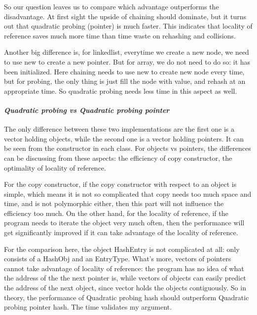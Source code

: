 \documentclass[]{article}
\let\oldparagraph\paragraph
\renewcommand{\paragraph}[1]{\oldparagraph{#1}\mbox{}}
\begin{document}
So our question leaves us to compare which advantage outperforms the
disadvantage. At first sight the upside of chaining should dominate, but
it turns out that quadratic probing (pointer) is much faster. This
indicates that locality of reference saves much more time than time
waste on rehashing and collisions.

Another big difference is, for linkedlist, everytime we create a new
node, we need to use new to create a new pointer. But for array, we do
not need to do so: it has been initialized. Here chaining needs to use
new to create new node every time, but for probing, the only thing is
just fill the node with value, and rehash at an appropriate time. So
quadratic probing needs less time in this aspect as well.

\paragraph{\texorpdfstring{\emph{Quadratic probing vs Quadratic probing
pointer}}{Quadratic probing vs Quadratic probing pointer}}\label{quadratic-probing-vs-quadratic-probing-pointer}

The only difference between these two implementations are the first one
is a vector holding objects, while the second one is a vector holding
pointers. It can be seen from the constructor in each class. For objects
vs pointers, the differences can be discussing from these aspects: the
efficiency of copy constructor, the optimality of locality of reference.

For the copy constructor, if the copy constructor with respect to an
object is simple, which means it is not so complicated that copy needs
too much space and time, and is not polymorphic either, then this part
will not influence the efficiency too much. On the other hand, for the
locality of reference, if the program needs to iterate the object very
much often, then the performance will get significantly improved if it
can take advantage of the locality of reference.

For the comparison here, the object HashEntry is not complicated at all:
only consists of a HashObj and an EntryType. What's more, vectors of
pointers cannot take advantage of locality of reference: the program has
no idea of what the address of the the next pointer is, while vectors of
objects can easily predict the address of the next object, since vector
holds the objects contiguously. So in theory, the performance of
Quadratic probing hash should outperform Quadratic probing pointer hash.
The time validates my argument.
\end{document}
